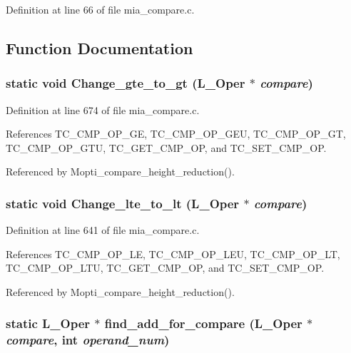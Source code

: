 Definition at line 66 of file mia\_\-compare.c.

\subsection{Function Documentation}
\subsubsection{\setlength{\rightskip}{0pt plus 5cm}static void Change\_\-gte\_\-to\_\-gt (L\_\-Oper $\ast$ {\em compare})\hspace{0.3cm}{\tt  [static]}}\label{mia__compare_8c_213151dda23d2f8b5032cf5ccfa86aa3}




Definition at line 674 of file mia\_\-compare.c.

References TC\_\-CMP\_\-OP\_\-GE, TC\_\-CMP\_\-OP\_\-GEU, TC\_\-CMP\_\-OP\_\-GT, TC\_\-CMP\_\-OP\_\-GTU, TC\_\-GET\_\-CMP\_\-OP, and TC\_\-SET\_\-CMP\_\-OP.

Referenced by Mopti\_\-compare\_\-height\_\-reduction().
\subsubsection{\setlength{\rightskip}{0pt plus 5cm}static void Change\_\-lte\_\-to\_\-lt (L\_\-Oper $\ast$ {\em compare})\hspace{0.3cm}{\tt  [static]}}\label{mia__compare_8c_97d71c12f70caacaadd256754007ee8a}




Definition at line 641 of file mia\_\-compare.c.

References TC\_\-CMP\_\-OP\_\-LE, TC\_\-CMP\_\-OP\_\-LEU, TC\_\-CMP\_\-OP\_\-LT, TC\_\-CMP\_\-OP\_\-LTU, TC\_\-GET\_\-CMP\_\-OP, and TC\_\-SET\_\-CMP\_\-OP.

Referenced by Mopti\_\-compare\_\-height\_\-reduction().
\subsubsection{\setlength{\rightskip}{0pt plus 5cm}static L\_\-Oper $\ast$ find\_\-add\_\-for\_\-compare (L\_\-Oper $\ast$ {\em compare}, int {\em operand\_\-num})\hspace{0.3cm}{\tt  [static]}}\label{mia__compare_8c_f5cee414849cdaf3c81c578524b18c87}




